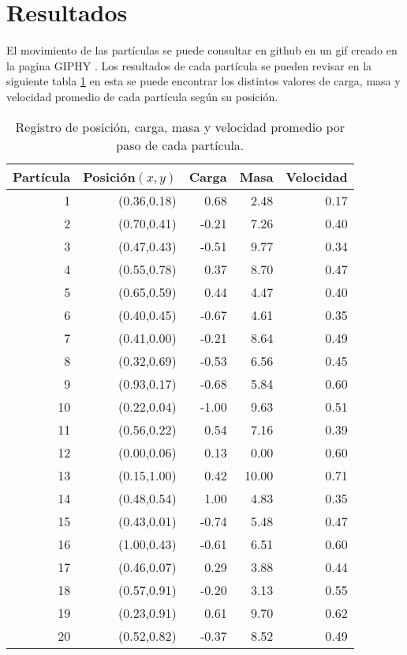 \documentclass[a4paper, 11pt]{article}
\begin{document}
\section{Resultados}
El movimiento de las partículas se puede consultar en github \cite{Edson} en un gif creado en la pagina GIPHY \cite{GIPHY}.
Los resultados de cada partícula se pueden revisar en la siguiente tabla \ref{tab1} en esta se puede encontrar los distintos valores de carga, masa y velocidad promedio de cada partícula según su posición. 
    \begin{table}[H]
        \caption{Registro de posición, carga, masa y velocidad promedio por paso de cada partícula.}
        \bigskip
        \label{tab1}
        \centering
        \begin{tabular}{|r|r|r|r|r|}
        \hline
         Partícula&Posición$(x,y)$&Carga&Masa&Velocidad  \\
        \hline
        1 & (0.36,0.18) & 0.68 & 2.48 & 0.17\\
        \hline
        2 & (0.70,0.41) & -0.21 & 7.26 & 0.40\\
        \hline
        3 & (0.47,0.43) & -0.51 & 9.77 & 0.34\\
        \hline
        4 & (0.55,0.78) & 0.37 & 8.70 & 0.47\\
        \hline
        5 & (0.65,0.59)  & 0.44 & 4.47 & 0.40\\
        \hline
        6 & (0.40,0.45) & -0.67 & 4.61 & 0.35\\
        \hline
        7 & (0.41,0.00) & -0.21 & 8.64 & 0.49\\
        \hline
        8 & (0.32,0.69) & -0.53 & 6.56 & 0.45\\
        \hline
        9 & (0.93,0.17) & -0.68 & 5.84 & 0.60\\
        \hline
        10 & (0.22,0.04) & -1.00 & 9.63 & 0.51\\
        \hline
        11 & (0.56,0.22) & 0.54 & 7.16 & 0.39\\
        \hline
        12 & (0.00,0.06) & 0.13 & 0.00 & 0.60\\
        \hline
        13 & (0.15,1.00) & 0.42 & 10.00 & 0.71\\
        \hline
        14 & (0.48,0.54) & 1.00 & 4.83 & 0.35\\
        \hline
        15 & (0.43,0.01) & -0.74 & 5.48 & 0.47\\
        \hline
        16 & (1.00,0.43) & -0.61 & 6.51 & 0.60\\
        \hline
        17 & (0.46,0.07) & 0.29 & 3.88 & 0.44\\
        \hline
        18 & (0.57,0.91) & -0.20 & 3.13 & 0.55\\
        \hline
        19 & (0.23,0.91) & 0.61 & 9.70 & 0.62\\
        \hline
        20 & (0.52,0.82) & -0.37 & 8.52 & 0.49\\
        \hline
        \end{tabular}
    \end{table}
\end{document}
